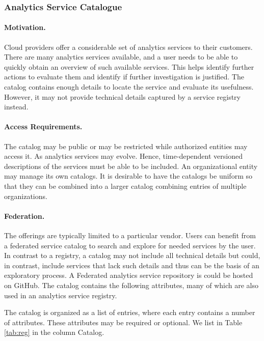
\subsubsection{Analytics Service Catalogue}
\label{sec:catalog}

\paragraph*{Motivation.}
Cloud providers offer a considerable set of analytics services to
their customers. There are many analytics services available, and a user
needs to be able to quickly obtain an overview of such available
services. This helps identify further actions to evaluate
them and identify if further investigation is justified. The catalog
contains enough details to locate the service and evaluate its
usefulness. However, it may not provide technical details 
captured by a service registry instead.

\paragraph*{Access Requirements.}
The catalog may be public or may be restricted while authorized
entities may access it. As analytics services may evolve. Hence,
time-dependent versioned descriptions of the services must be able to
be included. An organizational entity may manage its own
catalogs. It is desirable to have the catalogs be uniform so that
they can be combined into a larger catalog combining entries of
multiple organizations.

\paragraph*{Federation.}
The offerings are typically limited to a particular vendor. Users can
benefit from a federated service catalog to search and explore for
needed services by the user. In contrast to a registry, a catalog may
not include all technical details but could, in contrast, include
services that lack such details and thus can be the basis of an
exploratory process. A Federated analytics service repository is
could be hosted on GitHub. The catalog contains the
following attributes, many of which are also used in an analytics
service registry.

The catalog is organized as a list of entries, where each entry
contains a number of attributes. These attributes may be required or
optional. We list in Table \ref{tab:reg} in the column Catalog.



